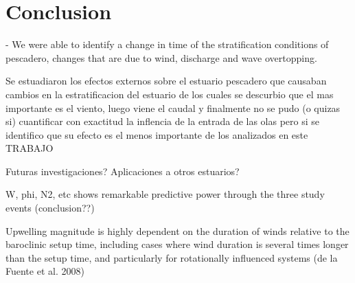 \documentclass[tesis.tex]{subfiles}
\begin{document}
  
\section{Conclusion}
- We were able to identify a change in time of the stratification conditions of pescadero, changes that are due to wind, discharge and wave overtopping.

Se estuadiaron los efectos externos sobre el estuario pescadero que causaban cambios en la estratificacion del estuario de los cuales se descurbio que el mas importante es el viento, luego viene el caudal y finalmente no se pudo (o quizas si) cuantificar con exactitud la inflencia de la entrada de las olas pero si se identifico que su efecto es el menos importante de los analizados en este TRABAJO



Futuras investigaciones?
Aplicaciones a otros estuarios?

W, phi, N2, etc shows remarkable predictive power through the three study
events (conclusion??)

Upwelling magnitude is highly dependent on the duration of
winds relative to the baroclinic setup time, including cases
where wind duration is several times longer than the setup
time, and particularly for rotationally influenced systems
(de la Fuente et al. 2008)
\end{document}
